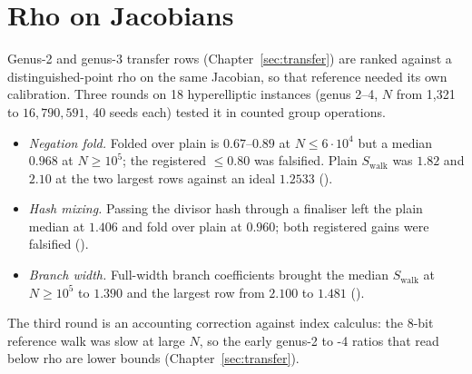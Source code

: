 \section{Rho on Jacobians}\label{sec:rv-jacobian}

Genus-2 and genus-3 transfer rows (Chapter~\ref{sec:transfer}) are ranked
against a distinguished-point rho on the same Jacobian, so that reference
needed its own calibration. Three rounds on 18 hyperelliptic instances
(genus 2--4, $N$ from 1{,}321 to $16{,}790{,}591$, 40 seeds each) tested it
in counted group operations.
\begin{itemize}
\item \emph{Negation fold.} Folded over plain is $0.67$--$0.89$ at
  $N\le6\cdot10^4$ but a median $0.968$ at $N\ge10^5$; the registered
  $\le0.80$ was falsified. Plain $S_{\text{walk}}$ was $1.82$ and $2.10$ at
  the two largest rows against an ideal $1.2533$
  ().
\item \emph{Hash mixing.} Passing the divisor hash through a finaliser
  left the plain median at $1.406$ and fold over plain at $0.960$; both
  registered gains were falsified ().
\item \emph{Branch width.} Full-width branch coefficients brought the
  median $S_{\text{walk}}$ at $N\ge10^5$ to $1.390$ and the largest row from
  $2.100$ to $1.481$ ().
\end{itemize}
The third round is an accounting correction against index calculus: the
8-bit reference walk was slow at large $N$, so the early genus-2 to -4
ratios that read below rho are lower bounds (Chapter~\ref{sec:transfer}).

